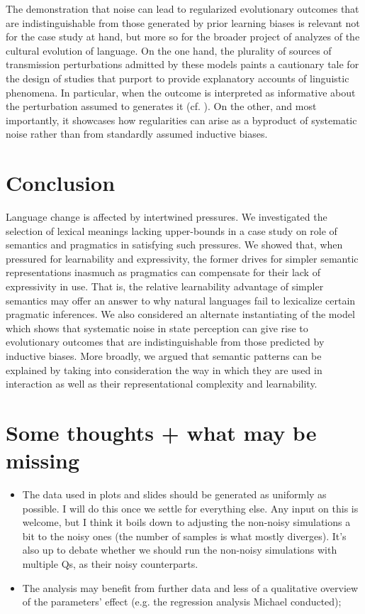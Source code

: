 \documentclass[a4paper]{article}
\begin{document}
The demonstration that noise can lead to regularized evolutionary outcomes that are indistinguishable from those generated by prior learning biases is relevant not for the case study at hand, but more so for the broader project of analyzes of the cultural evolution of language. On the one hand, the plurality of sources of transmission perturbations admitted by these models paints a cautionary tale for the design of studies that purport to provide explanatory accounts of linguistic phenomena. In particular, when the outcome is interpreted as informative about the perturbation assumed to generates it (cf. \citealt{tamariz+kirby:2016}). On the other, and most importantly, it showcases how regularities can arise as a byproduct of systematic noise rather than from standardly assumed inductive biases.



\section{Conclusion}
Language change is affected by intertwined pressures. We investigated the selection of lexical meanings lacking upper-bounds in a case study on role of semantics and pragmatics in satisfying such pressures. We showed that, when pressured for learnability and expressivity, the former drives for simpler semantic representations inasmuch as pragmatics can compensate for their lack of expressivity in use. That is, the relative learnability advantage of simpler semantics may offer an answer to why natural languages fail to lexicalize certain pragmatic inferences. We also considered an alternate instantiating of the model which shows that systematic noise in state perception can give rise to evolutionary outcomes that are indistinguishable from those predicted by inductive biases. More broadly, we argued that semantic patterns can be explained by taking into consideration the way in which they are used in interaction as well as their representational complexity and learnability.





\newpage

\section{Some thoughts + what may be missing}
\begin{itemize}
  \item The data used in plots and slides should be generated as uniformly as possible. I will do this once we settle for everything else. Any input on this is welcome, but I think it boils down to adjusting the non-noisy simulations a bit to the noisy ones (the number of samples is what mostly diverges). It's also up to debate whether we should run the non-noisy simulations with multiple Qs, as their noisy counterparts. 
  \item The analysis may benefit from further data and less of a qualitative overview of the parameters' effect (e.g. the regression analysis Michael conducted);
\end{itemize}
\end{document}
